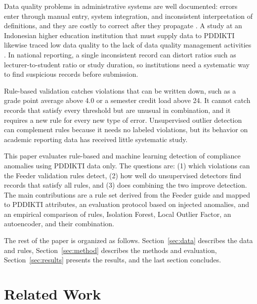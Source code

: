 \documentclass[conference]{IEEEtran}
\begin{document}
Data quality problems in administrative systems are well documented: errors enter through manual entry, system integration, and inconsistent interpretation of definitions, and they are costly to correct after they propagate \cite{whang2023dataquality,zha2025dcai}. A study at an Indonesian higher education institution that must supply data to PDDIKTI likewise traced low data quality to the lack of data quality management activities \cite{sumadi2021dq}. In national reporting, a single inconsistent record can distort ratios such as lecturer-to-student ratio or study duration, so institutions need a systematic way to find suspicious records before submission.

Rule-based validation catches violations that can be written down, such as a grade point average above 4.0 or a semester credit load above 24. It cannot catch records that satisfy every threshold but are unusual in combination, and it requires a new rule for every new type of error. Unsupervised outlier detection can complement rules because it needs no labeled violations, but its behavior on academic reporting data has received little systematic study.

This paper evaluates rule-based and machine learning detection of compliance anomalies using PDDIKTI data only. The questions are: (1) which violations can the Feeder validation rules detect, (2) how well do unsupervised detectors find records that satisfy all rules, and (3) does combining the two improve detection. The main contributions are a rule set derived from the Feeder guide and mapped to PDDIKTI attributes, an evaluation protocol based on injected anomalies, and an empirical comparison of rules, Isolation Forest, Local Outlier Factor, an autoencoder, and their combination.

The rest of the paper is organized as follows. Section~\ref{sec:data} describes the data and rules, Section~\ref{sec:method} describes the methods and evaluation, Section~\ref{sec:results} presents the results, and the last section concludes.

\section{Related Work}
\end{document}
